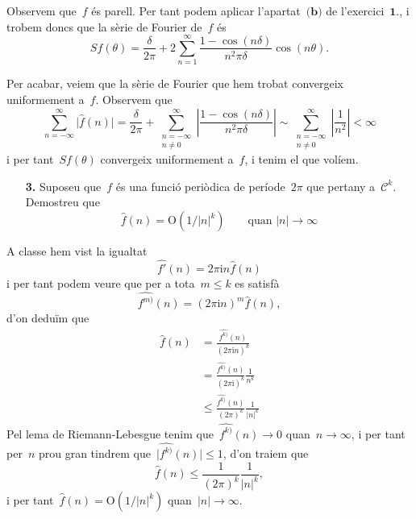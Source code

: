 \documentclass[a4paper]{article}
\newcommand{\iu}{\mathrm{i}}
\newcommand{\uppi}{\pi}
\newcommand{\abs}[1]{\lvert{#1}\rvert}
\newcommand{\Abs}[1]{\left\lvert{#1}\right\rvert}
\begin{document}
Observem que~\(f\) és parell. Per tant podem aplicar l'apartat~\(\textbf{(b)}\)
de l'exercici~\(\textbf{1.}\), i trobem doncs que la sèrie de Fourier de~\(f\)
és
\[
    Sf(\theta) = \frac{\delta}{2\uppi}
    + 2 \sum_{n = 1}^{\infty}
    \frac{1-\cos(n\delta)}{n^{2}\uppi\delta} \cos(n\theta).
\]

Per acabar, veiem que la sèrie de Fourier que hem trobat convergeix uniformement
a~\(f\). Observem que
\[
    \sum_{n=-\infty}^{\infty}\abs{\widehat{f}(n)}
    = \frac{\delta}{2\uppi} + \sum_{\substack{n=-\infty\\n\neq0}}^{\infty}
    \Abs{\frac{1 - \cos(n\delta)}{n^{2}\uppi\delta}}
    \sim \sum_{\substack{n=-\infty\\n\neq0}}^{\infty} \Abs{\frac{1}{n^{2}}}
    < \infty
\]
i per tant~\(Sf(\theta)\) convergeix uniformement a~\(f\), i tenim el que
volíem.

\clearpage
\begin{enumerate}
    \item[\textbf{3.}] Suposeu que~\(f\) és una funció periòdica de
        període~\(2\uppi\) que pertany a~\(\mathcal{C}^{k}\). Demostreu que
        \[
            \widehat{f}(n) = \mathrm{O}(1/\abs{n}^{k})
            \qquad\text{quan }
            \abs{n}\to\infty
        \]
\end{enumerate}
A classe hem vist la igualtat
\[
    \widehat{f'}(n) = 2\uppi\iu n\widehat{f}(n)
\]
i per tant podem veure que per a tota~\(m\leq k\) es satisfà
\[
    \widehat{f^{m)}}(n) = (2\uppi\iu n)^{m}\widehat{f}(n),
\]
d'on deduïm que
\begin{align*}
    \widehat{f}(n) &= \frac{\widehat{f^{k)}}(n)}{(2\uppi\iu n)^{k}} \\
                   &= \frac{\widehat{f^{k)}}(n)}{(2\uppi\iu)^{k}}
                      \frac{1}{n^{k}} \\
                   &\leq \frac{\widehat{f^{k)}}(n)}{(2\uppi)^{k}}
                      \frac{1}{\abs{n}^{k}}
\end{align*}
Pel lema de Riemann-Lebesgue tenim que~\(\widehat{f^{k)}}(n) \to 0\)
quan~\(n\to\infty\), i per tant per~\(n\) prou gran tindrem
que~\(\abs{\widehat{f^{k)}}(n)}\leq1\), d'on traiem que
\[
    \widehat{f}(n) \leq \frac{1}{(2\uppi)^{k}}\frac{1}{\abs{n}^{k}},
\]
i per tant~\(\widehat{f}(n) = \mathrm{O}(1/\abs{n}^{k})\)
quan~\(\abs{n}\to\infty\).
\end{document}

